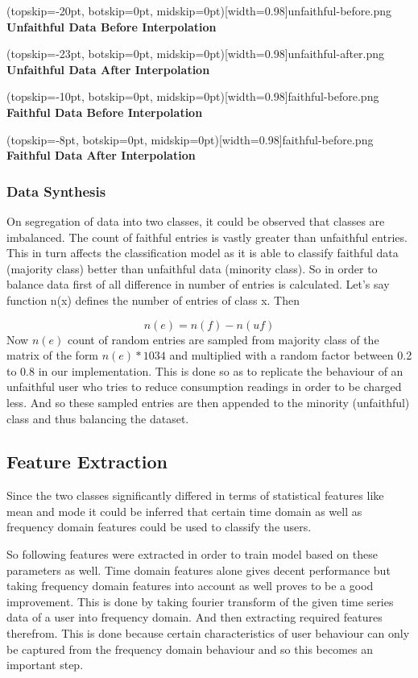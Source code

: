\documentclass{ieeeaccess}
\begin{document}
\Figure[t!](topskip=-20pt, botskip=0pt, midskip=0pt)[width=0.98\linewidth]{unfaithful-before.png}
{ \textbf{Unfaithful Data Before Interpolation}\label{fig3}}

\Figure[t!](topskip=-23pt, botskip=0pt, midskip=0pt)[width=0.98\linewidth]{unfaithful-after.png}
{ \textbf{Unfaithful Data After Interpolation}\label{fig4}}

\Figure[t!](topskip=-10pt, botskip=0pt, midskip=0pt)[width=0.98\linewidth]{faithful-before.png}
{ \textbf{Faithful Data Before Interpolation}\label{fig5}}

\Figure[t!](topskip=-8pt, botskip=0pt, midskip=0pt)[width=0.98\linewidth]{faithful-before.png}
{ \textbf{Faithful Data After Interpolation}\label{fig6}}

\subsubsection{Data Synthesis}{On segregation of data into two classes, it could be observed that classes are imbalanced. The count of faithful entries is vastly greater than unfaithful entries. This in turn affects the classification model as it is able to classify faithful data (majority class) better than unfaithful data (minority class).
So in order to balance data first of all difference in number of entries is calculated. Let's say function n(x) defines the number of entries of class x. Then}

\[ n(e)=n(f)-n(uf)\]
Now \(n(e)\) count of random entries are sampled from majority class of the matrix of the form \(n(e) * 1034\) and multiplied with a random factor between 0.2 to 0.8 in our implementation. This is done so as to replicate the behaviour of an unfaithful user who tries to reduce consumption readings in order to be charged less.
And so these sampled entries are then appended to the minority (unfaithful) class and thus balancing the dataset.

\subsection{Feature Extraction}
Since the two classes significantly differed in terms of statistical features like mean and mode it could be inferred that certain time domain as well as frequency domain features could be used to classify the users.

So following features were extracted in order to train model based on these parameters as well. Time domain features alone gives decent performance but taking frequency domain features into account as well proves to be a good improvement. This is done by taking fourier transform of the given time series data of a user into frequency domain. And then extracting required features therefrom. This is done because certain characteristics of user behaviour can only be captured from the frequency domain behaviour and so this becomes an important step.
\end{document}
